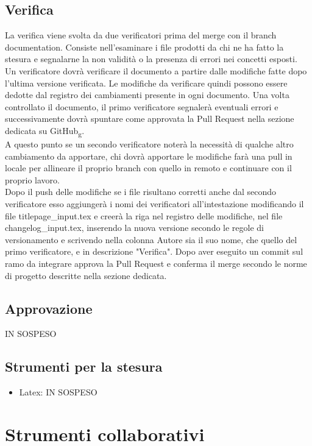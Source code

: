 \subsection{Verifica}
La verifica viene svolta da due verificatori prima del merge con il branch documentation.
Consiste nell'esaminare i file prodotti da chi ne ha fatto la stesura e segnalarne la non validità o 
la presenza di errori nei concetti esposti.\\
Un verificatore dovrà verificare il documento a partire dalle modifiche fatte dopo l'ultima versione verificata.
Le modifiche da verificare quindi possono essere dedotte dal registro dei cambiamenti presente in ogni documento.
Una volta controllato il documento, il primo verificatore segnalerà eventuali errori e
successivamente dovrà spuntare come approvata la Pull Request nella sezione dedicata su GitHub\textsubscript{g}. \\
A questo punto se un secondo verificatore noterà la necessità di qualche altro cambiamento da apportare, chi dovrà apportare le modifiche farà una pull in locale per
allineare il proprio branch con quello in remoto e continuare con il proprio lavoro.\\
Dopo il push delle modifiche se i file risultano corretti anche dal secondo verificatore esso aggiungerà i nomi dei verificatori all'intestazione modificando il file titlepage\_input.tex
 e creerà la riga nel registro delle modifiche, nel file changelog\_input.tex,  inserendo la nuova versione secondo le regole di versionamento e scrivendo nella colonna Autore sia il suo nome,
che quello del primo verificatore, e in descrizione "Verifica".
Dopo aver eseguito un commit sul ramo da integrare approva la Pull Request e conferma il merge secondo le norme di progetto descritte nella sezione dedicata.

\subsection{Approvazione}
IN SOSPESO
\subsection{Strumenti per la stesura}
\begin{itemize} 
    \item Latex: IN SOSPESO
\end{itemize}

\section{Strumenti collaborativi}
